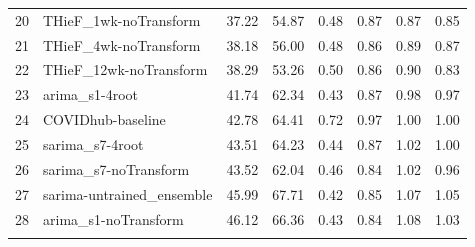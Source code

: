 \documentclass[12pt]{article}
\begin{document}
\begin{longtable}{llrrrrrr}
  20 & THieF\_1wk-noTransform & 37.22 & 54.87 & 0.48 & 0.87 & 0.87 & 0.85 \\ 
  21 & THieF\_4wk-noTransform & 38.18 & 56.00 & 0.48 & 0.86 & 0.89 & 0.87 \\ 
  22 & THieF\_12wk-noTransform & 38.29 & 53.26 & 0.50 & 0.86 & 0.90 & 0.83 \\ 
  23 & arima\_s1-4root & 41.74 & 62.34 & 0.43 & 0.87 & 0.98 & 0.97 \\ 
  24 & COVIDhub-baseline & 42.78 & 64.41 & 0.72 & 0.97 & 1.00 & 1.00 \\ 
  25 & sarima\_s7-4root & 43.51 & 64.23 & 0.44 & 0.87 & 1.02 & 1.00 \\ 
  26 & sarima\_s7-noTransform & 43.52 & 62.04 & 0.46 & 0.84 & 1.02 & 0.96 \\ 
  27 & sarima-untrained\_ensemble & 45.99 & 67.71 & 0.42 & 0.85 & 1.07 & 1.05 \\ 
  28 & arima\_s1-noTransform & 46.12 & 66.36 & 0.43 & 0.84 & 1.08 & 1.03 \\ 
   \hline
\hline
\label{tab:table_last17_states}
\end{longtable}
\endgroup
\newpage


\newpage
\end{document}
